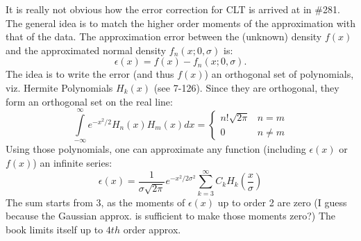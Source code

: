 \documentclass[a4paper, oneside]{book}
\begin{document}
It is really not obvious how the error correction for CLT is arrived at in \#281. The general idea is to match the higher order moments of the approximation with that of the data. The approximation error between the (unknown) density $f(x)$ and the approximated normal density $f_n(x; 0, \sigma)$ is:
%
\begin{equation}
\epsilon(x) = f(x)-f_n(x; 0, \sigma).
\end{equation}
%
The idea is to write the error (and thus $f(x)$) \ito an orthogonal set of polynomials, viz. Hermite Polynomials $H_k(x)$ (see 7-126). Since they are orthogonal, they form an orthogonal set on the real line:
%
\begin{equation}
\int\limits_{-\infty}^\infty e^{-x^2/2} H_n(x) H_m(x) dx = \begin{cases}n!\sqrt{2\pi}&n=m\\0&n\neq m\end{cases}
\label{eq:h_orth}
\end{equation}
%
Using those polynomials, one can approximate any function (including $\epsilon(x)$ or $f(x)$) \ito an infinite series:
%
\begin{equation}
\epsilon(x) = \frac{1}{\sigma \sqrt{2\pi}}e^{-x^2/2\sigma^2}\sum\limits_{k=3}^\infty C_k H_k\left(\frac{x}{\sigma}\right)
\end{equation}
%
The sum starts from $3$, as the moments of $\epsilon(x)$ up to order 2 are zero (I guess because the Gaussian approx. is sufficient to make those moments zero?) The book limits itself up to $4th$ order approx.
\end{document}
